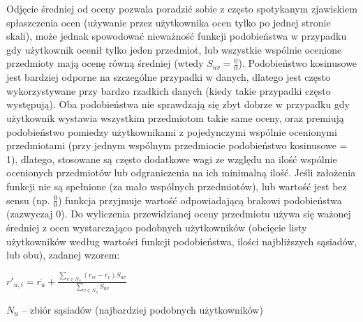 \documentclass{pracamgr}
\begin{document}
   Odjęcie średniej od oceny pozwala poradzić sobie z często spotykanym zjawiskiem spłaszczenia ocen (używanie przez użytkownika ocen tylko po jednej stronie skali),
   może jednak spowodować nieważność funkcji podobieństwa w przypadku gdy użytkownik ocenił tylko jeden przedmiot,
   lub wszystkie wspólnie ocenione przedmioty mają ocenę równą średniej (wtedy $S_{uv}=\frac{0}{0}$).
   Podobieństwo kosinusowe jest bardziej odporne na szczególne przypadki w danych,
   dlatego jest często wykorzystywane przy bardzo rzadkich danych (kiedy takie przypadki często występują).
   Oba podobieństwa nie sprawdzają się zbyt dobrze w przypadku gdy użytkownik wystawia wszystkim przedmiotom takie same oceny,
   oraz premiują podobieństwo pomiedzy użytkownikami z pojedynczymi wspólnie ocenionymi przedmiotami (przy jednym wspólnym przedmiocie podobieństwo kosinusowe = 1),
   dlatego, stosowane są często dodatkowe wagi ze względu na ilość wspólnie ocenionych przedmiotów lub odgraniczenia na ich minimalną ilość.
   Jeśli założenia funkcji nie są spełnione (za mało wspólnych przedmiotów), lub wartość jest bez sensu (np. $\frac{0}{0}$)
   funkcja przyjmuje wartość odpowiadającą brakowi podobieństwa (zazwyczaj 0).\newline\newline
   Do wyliczenia przewidzianej oceny przedmiotu używa się ważonej średniej z ocen wystarczająco podobnych użytkowników
   (obcięcie listy użytkowników według wartości funkcji podobieństwa, ilości najbliższych sąsiadów, lub obu), zadanej wzorem:\newline
   \begin{center}
    $r'_{u,i}=\overline{r_{u}}+\frac{\sum\limits_{v\in N_u}(r_{vi}-\overline{r_v})S_{uv}}{\sum\limits_{v\in N_u}S_{uv}}$
   \end{center}
   {\scriptsize
   $N_u$ -- zbiór sąsiadów (najbardziej podobnych użytkowników)
   }\newline
\end{document}
